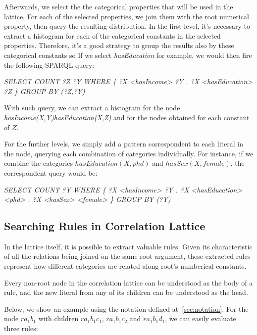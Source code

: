 Afterwards, we select the the categorical properties that will be used in the lattice. For each of the selected
properties, we join them with the root numerical property, then query the resulting distribution. In the first level,
it's necessary to extract a histogram for each of the categorical constants in the selected properties. Therefore, it's
a good strategy to group the results also by these categorical constants so If we select \emph{hasEducation} for
example, we would then fire the following SPARQL query:

\begin{center}
 \emph{SELECT COUNT ?Z ?Y WHERE \{ ?X <hasIncome> ?Y . ?X <hasEducation> ?Z \} GROUP BY (?Z,?Y)}
\end{center}

With such query, we can extract a histogram for the node \emph{hasIncome(X,Y)hasEducation(X,Z)} and for the
nodes obtained for each constant of $Z$. 

For the further levels, we simply add a pattern correspondent to each literal in the node, querying each combination of
categories individually. For instance, if we combine the categories $hasEducation(X,phd)$ and $hasSex(X,female)$, the
correspondent query would be:

\begin{center}
 \emph{SELECT COUNT ?Y WHERE \{ ?X <hasIncome> ?Y . ?X <hasEducation> <phd> . ?X <hasSex> <female> \} GROUP BY (?Y)}
\end{center}


\subsection{Searching Rules in Correlation Lattice}
\label{sec:searchRulesInCL}

In the lattice itself, it is possible to extract valuable rules. Given its characteristic of all the relations being
joined on the same root argument, these extracted rules represent how different categories are related along root's
numberical
constants.

Every non-root node in the correlation lattice can be understood as the body of a rule, and the new literal from any of
its children can be understood as the head. 

Below, we show an example using the notation defined at~\ref{sec:notation}. For the node $r a_1 b_1$ with children $r
a_1 b_1 c_1$, $r a_1 b_1 c_2$ and $r a_1 b_1 d_1$, we can easily evaluate three rules:

